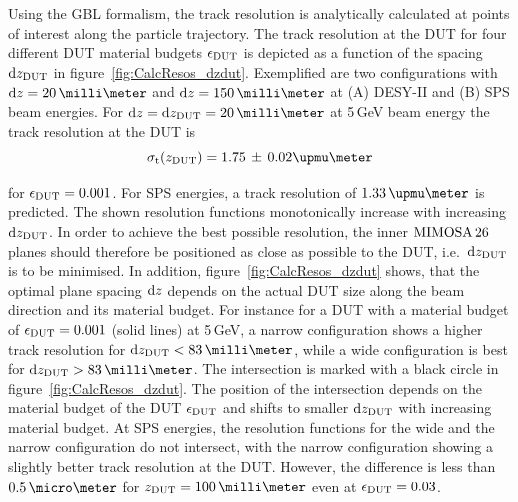 
Using the GBL formalism, the track resolution is analytically calculated at points of interest along the particle trajectory. 
The track resolution at the DUT for four different DUT material budgets $\mathnormal{\epsilon_{\textrm{DUT}}}$ is depicted as a function of the spacing $\textrm{d}z_{\textrm{DUT}}$ in figure~\ref{fig:CalcResos_dzdut}.
Exemplified are two configurations with $\dz = 20\,\milli\meter$ and $\dz = 150\,\milli\meter$ at (A) DESY-II and (B) SPS beam energies. 
For $\dz = \dzdut = 20\,\milli\meter$ at 5\,GeV beam energy the track resolution at the DUT is 
\begin{equation}
 \sigmat(\zdut) = 1.75\,\pm\,0.02\upmu\meter
\end{equation}

\noindent
for $\mathnormal{\epsilon_{\textrm{DUT}}} = 0.001$.
For SPS energies, a track resolution of $1.33\,\upmu\meter$ is predicted.
The shown resolution functions monotonically increase with increasing $\textrm{d}z_{\textrm{DUT}}$. 
In order to achieve the best possible resolution, the inner $\textrm{MIMOSA\,26}$ planes should therefore be positioned as close as possible to the DUT, i.e.~$\textrm{d}z_{\textrm{DUT}}$ is to be minimised. 
In addition, figure~\ref{fig:CalcResos_dzdut} shows, that the optimal plane spacing $\textrm{d}z$ depends on the actual DUT size along the beam direction and its material budget.
For instance for a DUT with a material budget of $\mathnormal{\epsilon_{\textrm{DUT}}} = 0.001$ (solid lines) at 5\,GeV, a narrow configuration shows a higher track resolution for $\dzdut < 83\,\milli\meter$,
 while a wide configuration is best for $\dzdut > 83\,\milli\meter$.
The intersection is marked with a black circle in figure~\ref{fig:CalcResos_dzdut}. 
The position of the intersection depends on the material budget of the DUT $\mathnormal{\epsilon_{\textrm{DUT}}}$ and shifts to smaller $\textrm{d}z_{\textrm{DUT}}$ with increasing material budget. 
At SPS energies, the resolution functions for the wide and the narrow configuration do not intersect, with the narrow configuration showing a slightly better track resolution at the DUT. 
However, the difference is less than $0.5\,\micro\meter$ for $\zdut = 100\,\milli\meter$ even at $\mathnormal{\epsilon_{\textrm{DUT}}} = 0.03$. 

